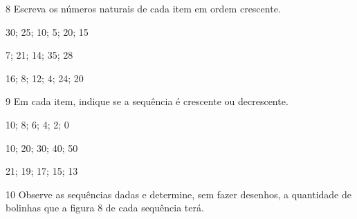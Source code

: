 \num{8} Escreva os números naturais de cada item em ordem crescente.

\begin{escolha}
\item 30; 25; 10; 5; 20; 15

\item 7; 21; 14; 35; 28

\item 16; 8; 12; 4; 24; 20
\end{escolha}

\num{9} Em cada item, indique se a sequência é crescente ou decrescente.

\begin{escolha}
\item 10; 8; 6; 4; 2; 0

\item 10; 20; 30; 40; 50

\item 21; 19; 17; 15; 13

\end{escolha}

\num{10} Observe as sequências dadas e determine, sem fazer desenhos, a
quantidade de bolinhas que a figura 8 de cada sequência terá.

